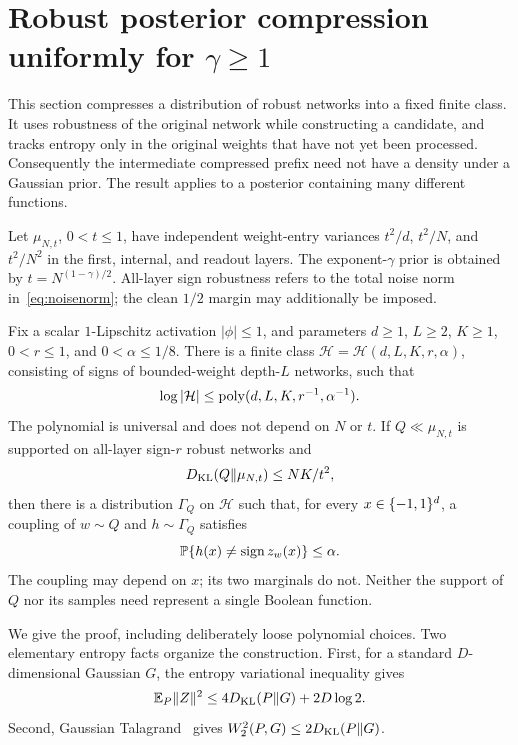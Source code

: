 \section{Robust posterior compression uniformly for \texorpdfstring{$\gamma\ge1$}{gamma at least one}}
\label{sec:robust-entropy}

This section compresses a distribution of robust networks into a fixed
finite class. It uses robustness of the original network while constructing
a candidate, and tracks entropy
only in the original weights that have not yet been processed. Consequently
the intermediate compressed prefix need not have a density under a Gaussian
prior. The result applies to a posterior containing many different functions.

Let $\mu_{N,t}$, $0<t\le1$, have independent weight-entry variances
$t^2/d$, $t^2/N$, and $t^2/N^2$ in the first, internal, and readout layers.
The exponent-$\gamma$ prior is obtained by $t=N^{(1-\gamma)/2}$.
All-layer sign robustness refers to the total noise norm
in~\eqref{eq:noisenorm}; the clean $1/2$ margin may additionally be imposed.

\begin{theorem}
\label{thm:robust-entropy}
Fix a scalar $1$-Lipschitz activation $|\phi|\le1$, and parameters
$d\ge1$, $L\ge2$, $K\ge1$, $0<r\le1$, and $0<\alpha\le1/8$.
There is a finite class $\mathcal H=\mathcal H(d,L,K,r,\alpha)$, consisting of
signs of bounded-weight depth-$L$ networks, such that
\[
 \log|\mathcal H|\le\operatorname{poly}(d,L,K,r^{-1},\alpha^{-1}).
\]
The polynomial is universal and does not depend on $N$ or $t$.
If $Q\ll\mu_{N,t}$ is supported on all-layer sign-$r$ robust networks and
\[
 D_{\rm KL}(Q\Vert\mu_{N,t})\le NK/t^2,
\]
then there is a distribution $\Gamma_Q$ on $\mathcal H$ such that, for every
$x\in\{-1,1\}^d$, a coupling of $w\sim Q$ and $h\sim\Gamma_Q$ satisfies
\[
 \mathbb P\{h(x)\ne\operatorname{sign} z_w(x)\}\le\alpha.
\]
The coupling may depend on $x$; its two marginals do not. Neither the support
of $Q$ nor its samples need represent a single Boolean function.
\end{theorem}

We give the proof, including deliberately loose polynomial choices.
Two elementary entropy facts organize the construction. First, for a standard
$D$-dimensional Gaussian $G$, the entropy variational inequality gives
\begin{equation}\label{eq:entropy-moment}
 \mathbb E_P\|Z\|^2\le4D_{\rm KL}(P\Vert G)+2D\log2.
\end{equation}
Second, Gaussian Talagrand~\cite{talagrand} gives
$W_2^2(P,G)\le2D_{\rm KL}(P\Vert G)$.


